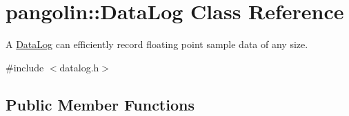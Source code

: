 \hypertarget{classpangolin_1_1_data_log}{}\section{pangolin\+:\+:Data\+Log Class Reference}
\label{classpangolin_1_1_data_log}


A \hyperlink{classpangolin_1_1_data_log}{Data\+Log} can efficiently record floating point sample data of any size.  




{\ttfamily \#include $<$datalog.\+h$>$}

\subsection*{Public Member Functions}
